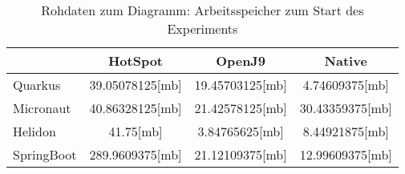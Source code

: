 \begin{table}[h]
    \centering
    \begin{tabular}{l|ccc}
        \hline
        & HotSpot & OpenJ9 & Native \\
        \hline
        Quarkus & 39.05078125[mb] & 19.45703125[mb] & 4.74609375[mb] \\
        Micronaut & 40.86328125[mb] & 21.42578125[mb] & 30.43359375[mb] \\
        Helidon & 41.75[mb] & 3.84765625[mb] & 8.44921875[mb] \\
        SpringBoot & 289.9609375[mb] & 21.12109375[mb] & 12.99609375[mb] \\
        \hline
    \end{tabular}
    \caption{Rohdaten zum Diagramm: Arbeitsspeicher zum Start des Experiments}
\end{table}
